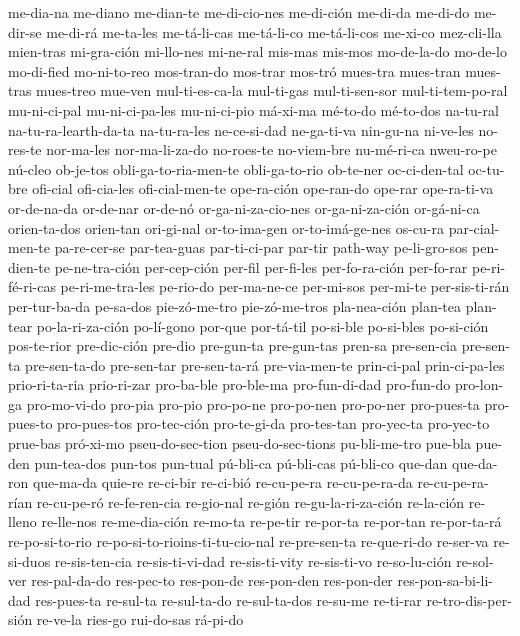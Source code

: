 {me-dia-na
me-diano
me-dian-te
me-di-cio-nes
me-di-ción
me-di-da
me-di-do
me-dir-se
me-di-rá
me-ta-les
me-tá-li-cas
me-tá-li-co
me-tá-li-cos
me-xi-co
mez-cli-lla
mien-tras
mi-gra-ción
mi-llo-nes
mi-ne-ral
mis-mas
mis-mos
mo-de-la-do
mo-de-lo
mo-di-fied
mo-ni-to-reo
mos-tran-do
mos-trar
mos-tró
mues-tra
mues-tran
mues-tras
mues-treo
mue-ven
mul-ti-es-ca-la
mul-ti-gas
mul-ti-sen-sor
mul-ti-tem-po-ral
mu-ni-ci-pal
mu-ni-ci-pa-les
mu-ni-ci-pio
má-xi-ma
mé-to-do
mé-to-dos
na-tu-ral
na-tu-ra-learth-da-ta
na-tu-ra-les
ne-ce-si-dad
ne-ga-ti-va
nin-gu-na
ni-ve-les
no-res-te
nor-ma-les
nor-ma-li-za-do
no-roes-te
no-viem-bre
nu-mé-ri-ca
nweu-ro-pe
nú-cleo
ob-je-tos
obli-ga-to-ria-men-te
obli-ga-to-rio
ob-te-ner
oc-ci-den-tal
oc-tu-bre
ofi-cial
ofi-cia-les
ofi-cial-men-te
ope-ra-ción
ope-ran-do
ope-rar
ope-ra-ti-va
or-de-na-da
or-de-nar
or-de-nó
or-ga-ni-za-cio-nes
or-ga-ni-za-ción
or-gá-ni-ca
orien-ta-dos
orien-tan
ori-gi-nal
or-to-ima-gen
or-to-imá-ge-nes
os-cu-ra
par-cial-men-te
pa-re-cer-se
par-tea-guas
par-ti-ci-par
par-tir
path-way
pe-li-gro-sos
pen-dien-te
pe-ne-tra-ción
per-cep-ción
per-fil
per-fi-les
per-fo-ra-ción
per-fo-rar
pe-ri-fé-ri-cas
pe-ri-me-tra-les
pe-rio-do
per-ma-ne-ce
per-mi-sos
per-mi-te
per-sis-ti-rán
per-tur-ba-da
pe-sa-dos
pie-zó-me-tro
pie-zó-me-tros
pla-nea-ción
plan-tea
plan-tear
po-la-ri-za-ción
po-lí-gono
por-que
por-tá-til
po-si-ble
po-si-bles
po-si-ción
pos-te-rior
pre-dic-ción
pre-dio
pre-gun-ta
pre-gun-tas
pren-sa
pre-sen-cia
pre-sen-ta
pre-sen-ta-do
pre-sen-tar
pre-sen-ta-rá
pre-via-men-te
prin-ci-pal
prin-ci-pa-les
prio-ri-ta-ria
prio-ri-zar
pro-ba-ble
pro-ble-ma
pro-fun-di-dad
pro-fun-do
pro-lon-ga
pro-mo-vi-do
pro-pia
pro-pio
pro-po-ne
pro-po-nen
pro-po-ner
pro-pues-ta
pro-pues-to
pro-pues-tos
pro-tec-ción
pro-te-gi-da
pro-tes-tan
pro-yec-ta
pro-yec-to
prue-bas
pró-xi-mo
pseu-do-sec-tion
pseu-do-sec-tions
pu-bli-me-tro
pue-bla
pue-den
pun-tea-dos
pun-tos
pun-tual
pú-bli-ca
pú-bli-cas
pú-bli-co
que-dan
que-da-ron
que-ma-da
quie-re
re-ci-bir
re-ci-bió
re-cu-pe-ra
re-cu-pe-ra-da
re-cu-pe-ra-rían
re-cu-pe-ró
re-fe-ren-cia
re-gio-nal
re-gión
re-gu-la-ri-za-ción
re-la-ción
re-lleno
re-lle-nos
re-me-dia-ción
re-mo-ta
re-pe-tir
re-por-ta
re-por-tan
re-por-ta-rá
re-po-si-to-rio
re-po-si-to-rioins-ti-tu-cio-nal
re-pre-sen-ta
re-que-ri-do
re-ser-va
re-si-duos
re-sis-ten-cia
re-sis-ti-vi-dad
re-sis-ti-vity
re-sis-ti-vo
re-so-lu-ción
re-sol-ver
res-pal-da-do
res-pec-to
res-pon-de
res-pon-den
res-pon-der
res-pon-sa-bi-li-dad
res-pues-ta
re-sul-ta
re-sul-ta-do
re-sul-ta-dos
re-su-me
re-ti-rar
re-tro-dis-per-sión
re-ve-la
ries-go
rui-do-sas
rá-pi-do
}
